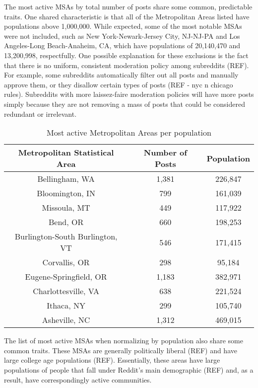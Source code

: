 \documentclass[12pt,oneside, letterpaper]{book}
\begin{document}
\par The most active MSAs by total number of posts share some common, predictable traits. One shared characteristic is that all of the Metropolitan Areas listed have populations above 1,000,000. While expected, some of the most notable MSAs were not included, such as New York-Newark-Jersey City, NJ-NJ-PA and Los Angeles-Long Beach-Anaheim, CA, which have populations of 20,140,470 and 13,200,998, respectfully. One possible explanation for these exclusions is the fact that there is no uniform, consistent moderation policy among subreddits (REF). For example, some subreddits automatically filter out all posts and manually approve them, or they disallow certain types of posts (REF - nyc n chicago rules). Subreddits with more laissez-faire moderation policies will have more posts simply because they are not removing a mass of posts that could be considered redundant or irrelevant.

\begin{table}[h!]
    \centering
    \small
    \caption{Most active Metropolitan Areas per population}
    \begin{tabular}{| c | c | c |}
    \hline
    Metropolitan Statistical Area & Number of Posts & Population\\ \hline
    Bellingham, WA & 1,381 & 226,847 \\ \hline
    Bloomington, IN & 799 & 161,039 \\ \hline
    Missoula, MT & 449 & 117,922 \\ \hline
    Bend, OR & 660 & 198,253 \\ \hline
    Burlington-South Burlington, VT & 546 & 171,415 \\ \hline
    Corvallis, OR & 298 & 95,184 \\ \hline
    Eugene-Springfield, OR & 1,183 & 382,971 \\ \hline
    Charlottesville, VA & 638 & 221,524 \\ \hline
    Ithaca, NY & 299 & 105,740 \\ \hline
    Asheville, NC & 1,312 & 469,015 \\ \hline
	\end{tabular}
	\label{table:table-2}
\end{table}

\par The list of most active MSAs when normalizing by population also share some common traits. These MSAs are generally politically liberal (REF) and have large college age populations (REF). Essentially, these areas have large populations of people that fall under Reddit's main demographic (REF) and, as a result, have correspondingly active communities.
\end{document}
